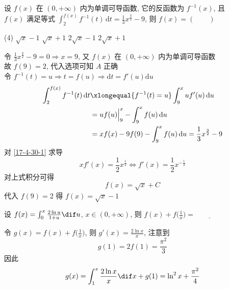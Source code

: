 \documentclass[color=green,titlestyle=hang]{elegantbook}%
\begin{document}
\begin{exercise}设 $f(x)$ 在 $(0,+\infty)$ 内为单调可导函数, 它的反函数为 $f^{-1}(x)$, 且\\
$f(x)$ 满足等式 $\int_2^{f(x)}f^{-1}(t)\,\mathrm{d}t=\frac{1}{3}x^{\frac{3}{2}}-9$, 则 $f(x)=(\qquad)$
\begin{tasks}(4)
	\task $\sqrt{x}-1$
	\task $\sqrt{x}+1$
	\task $2\sqrt{x}-1$
	\task $2\sqrt{x}+1$		
\end{tasks}
\end{exercise}\begin{solution}令 
$\frac{1}{3}x^{\frac{3}{2}}-9=0\Longrightarrow x=9$,  又 $f(x)$ 在 $(0,+\infty)$ 内为单调可导函数\\故 $ f(9)=2$, 代入选项可知 $A$ 正确\\
令 $f^{-1}(t)=u\Longrightarrow t=f(u)\Longrightarrow \mathrm{d}t=f'(u)\mathrm{d}u$\begin{align}
\int_2^{f(x)}f^{-1}(t)\,\mathrm{d}t
&\xlongequal{f^{-1}(t)=u}\int_9^xuf'(u)\,\mathrm{d}u\nonumber\\
&=uf(u)\Big|_9^x-\int_9^xf(u)\,\mathrm{d}u\nonumber\\
&=xf(x)-9f(9)-\int_9^xf(u)\,\mathrm{d}u=\frac{1}{3}x^{\frac{3}{2}}-9\label{17-4-30-1}
\end{align}
对 \eqref{17-4-30-1} 求导\[xf'(x)=\frac{1}{2}x^{\frac{1}{2}}\Longleftrightarrow f'(x)=\frac{1}{2}x^{-\frac{1}{2}}\]
对上式积分可得\[f(x)=\sqrt{x}+C\]
代入 $f(9)=2$ 得 $f(x)=\sqrt{x}-1$
\end{solution}

\begin{example}
设 $f(x)=\int_0^x\frac{2\ln u}{1+u}\dif u$, $x\in(0,+\infty)$, 则 $f(x)+f\Big(\frac{1}{x}\Big)=\underline{\qquad\qquad}$
\end{example}\begin{solution}
令 $g(x)=f(x)+f\Big(\frac{1}{x}\Big)$, 则 $g'(x)=\frac{2\ln x}{x}$, 
注意到 \[g(1)=2f(1)=\frac{\pi^2}{3}\]
因此\[g(x)=\int_1^x\frac{2\ln x}{x}\dif x+g(1)=\ln^2x+\frac{\pi^2}{4}\]
\end{solution}
\end{document}

